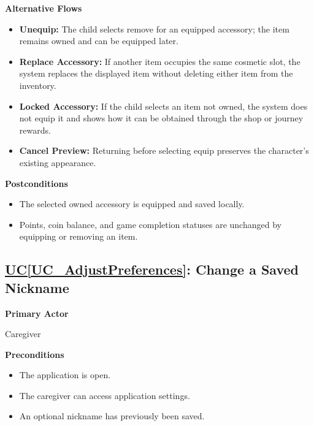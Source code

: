 \documentclass[12pt]{article}
\newcounter{ucnum} %
\newcommand{\ucref}[1]{\hyperref[#1]{UC\ref*{#1}}}
\begin{document}
\textbf{Alternative Flows}
\begin{itemize}
    \item \textbf{Unequip:} The child selects remove for an equipped
    accessory; the item remains owned and can be equipped later.
    \item \textbf{Replace Accessory:} If another item occupies the
    same cosmetic slot, the system replaces the displayed item
    without deleting either item from the inventory.
    \item \textbf{Locked Accessory:} If the child selects an item not
    owned, the system does not equip it and shows how it can be
    obtained through the shop or journey rewards.
    \item \textbf{Cancel Preview:} Returning before selecting equip
    preserves the character's existing appearance.
\end{itemize}

\textbf{Postconditions}
\begin{itemize}
    \item The selected owned accessory is equipped and saved locally.
    \item Points, coin balance, and game completion statuses
    are unchanged by equipping or removing an item.
\end{itemize}

\label{UC_AdjustPreferences}
\subsection{\ucref{UC_AdjustPreferences}: Change a Saved Nickname}

\textbf{Primary Actor}

Caregiver

\textbf{Preconditions}
\begin{itemize}
    \item The application is open.
    \item The caregiver can access application settings.
    \item An optional nickname has previously been saved.
\end{itemize}
\end{document}
